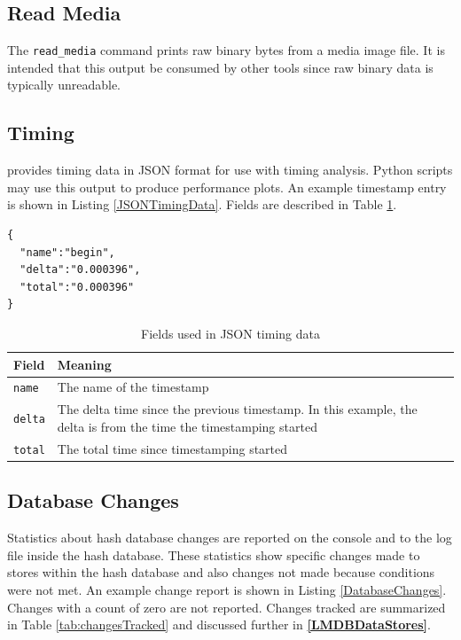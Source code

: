 \documentclass[11pt,fleqn]{article} %
\begin{document}
\subsection{Read Media}
The \verb+read_media+ command prints raw binary bytes from a media image file. It is intended that this output be consumed by other tools since raw binary data is typically unreadable.\\

\subsection{Timing}
\hdb provides timing data in JSON format for use with timing analysis. Python scripts may use this output to produce performance plots. An example timestamp entry is shown in Listing \ref{JSONTimingData}. Fields are described in Table \ref{tab:JSONTimingData}.\\

\lstset{style=customfile}
\begin{lstlisting}[float, caption={Example JSON timestamp format}, label=JSONTimingData]
{
  "name":"begin",
  "delta":"0.000396",
  "total":"0.000396"
}
\end{lstlisting}

\begin{table}[!ht]

\centering
\caption{Fields used in JSON timing data}
\label{tab:JSONTimingData}
\begin{tabular}{|p{5 cm}|p{8.8 cm}|}
\hline \hline
\textbf{Field} & \textbf{Meaning} \\
\hline
\verb+name+ & The name of the timestamp\\
\hline
\verb+delta+ & The delta time since the previous timestamp. In this example, the delta is from the time the timestamping started\\
\hline
\verb+total+ & The total time since timestamping started\\
\hline
\end{tabular}
\end{table}

\subsection{Database Changes}
Statistics about hash database changes are reported on the console and to the log file inside the hash database. These statistics show specific changes made to stores within the hash database and also changes not made because conditions were not met. An example change report is shown in Listing \ref{DatabaseChanges}. Changes with a count of zero are not reported. Changes tracked are summarized in Table \ref{tab:changesTracked} and discussed further in \textbf{\autoref{LMDBDataStores}}.\\
\end{document}
